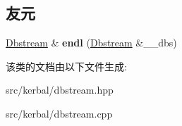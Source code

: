 \subsection*{友元}
\begin{DoxyCompactItemize}
\item 
\mbox{\label{classkerbal_1_1utility_1_1dbstream_1_1_dbstream_a4dc02b9a785570d989530c7c67fc604b}} 
\hyperlink{classkerbal_1_1utility_1_1dbstream_1_1_dbstream}{Dbstream} \& {\bfseries endl} (\hyperlink{classkerbal_1_1utility_1_1dbstream_1_1_dbstream}{Dbstream} \&\+\_\+\+\_\+dbs)
\end{DoxyCompactItemize}


该类的文档由以下文件生成\+:\begin{DoxyCompactItemize}
\item 
src/kerbal/dbstream.\+hpp\item 
src/kerbal/dbstream.\+cpp\end{DoxyCompactItemize}
